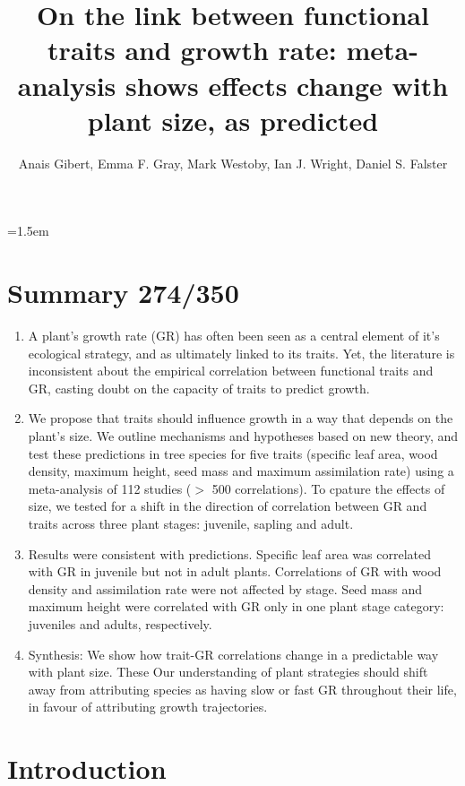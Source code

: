 \documentclass[a4paper,11pt]{article}
\title{On the link between functional traits and growth rate: meta-analysis shows effects change with plant size, as predicted}
\author{Anais Gibert\textasteriskcentered, Emma F. Gray, Mark Westoby, Ian J. Wright, Daniel S. Falster}
\affiliation{Biological Sciences, Macquarie University NSW 2109, Australia\\
\textasteriskcentered Email for correspondence: \texttt{anais.gibert@gmail.com}\\
Word count: ~XXXX words}
\date{}
\begin{document}
\mstitlepage
\noindent
\parindent=1.5em
\addtolength{\parskip}{.3em}
\doublespacing
\linenumbers
\section{Summary 274/350}\label{abstract}
\begin{enumerate}
\def\labelenumi{\arabic{enumi}.}
\itemsep1pt\parskip0pt
\item A plant's growth rate (GR) has often been seen as a central element of it's ecological strategy, and as ultimately linked to its traits. Yet, the literature is inconsistent about the empirical correlation between functional traits and GR, casting doubt on the capacity of traits to predict growth.

\item We propose that traits should influence growth in a way that depends on the plant's size. We outline mechanisms and hypotheses based on new theory, and test these predictions in tree species for five traits (specific leaf area, wood density, maximum height, seed mass and maximum assimilation rate) using a meta-analysis of 112 studies ($>$ 500 correlations). To cpature the effects of size, we tested for a shift in the direction of correlation between GR and traits across three plant stages: juvenile, sapling and adult.

\item Results were consistent with predictions. Specific leaf area was correlated with GR in juvenile but not in adult plants. Correlations of GR with wood density and assimilation rate were not affected by stage. Seed mass and maximum height were correlated with GR only in one plant stage category: juveniles and adults, respectively.

\item Synthesis: We show how trait-GR correlations change in a predictable way with plant size. These  Our understanding of plant strategies should shift away from attributing species as having slow or fast GR throughout their life, in favour of attributing growth trajectories.

\end{enumerate}

\clearpage

\section*{Introduction}\label{introduction}
\end{document}
